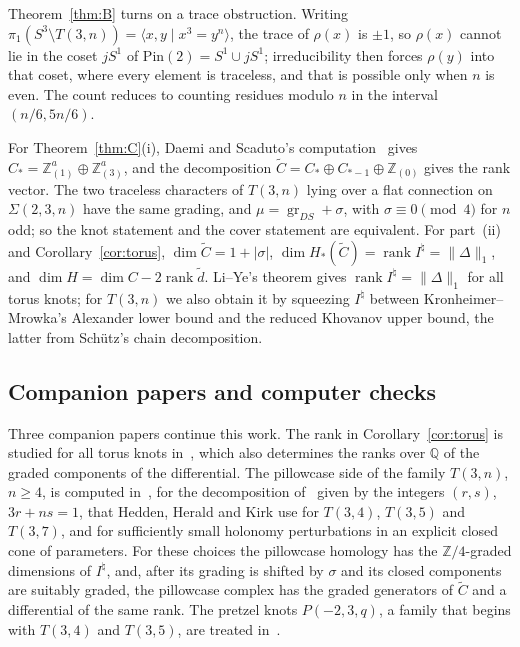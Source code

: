 \documentclass[11pt,reqno]{amsart}
\theoremstyle{plain}
\theoremstyle{definition}
\newcommand{\Z}{\mathbb{Z}}
\newcommand{\Pin}{\mathrm{Pin}(2)}
\newcommand{\Inat}{I^{\natural}}
\newcommand{\gr}{\operatorname{gr}}
\newcommand{\Sig}{\Sigma}
\newcommand{\td}{\widetilde d}
\begin{document}
Theorem~\ref{thm:B} turns on a trace obstruction. Writing $\pi_1(S^3\setminus T(3,n))=\langle x,y\mid
x^3=y^n\rangle$, the trace of $\rho(x)$ is $\pm1$, so $\rho(x)$ cannot lie in the coset $jS^1$ of
$\Pin=S^1\cup jS^1$; irreducibility then forces $\rho(y)$ into that coset, where every element is
traceless, and that is possible only when $n$ is even. The count reduces to counting residues modulo
$n$ in the interval $(n/6,5n/6)$.

For Theorem~\ref{thm:C}(i), Daemi and Scaduto's computation~\cite[Cor.~3]{DScaduto} gives $C_*=\Z^a_{(1)}\oplus\Z^a_{(3)}$, and
the decomposition $\widetilde C=C_*\oplus C_{*-1}\oplus\Z_{(0)}$ gives the rank vector. The two traceless
characters of $T(3,n)$ lying over a flat connection on $\Sig(2,3,n)$ have the same grading, and
$\mu=\gr_{DS}+\sigma$, with $\sigma\equiv0\pmod4$ for $n$ odd; so the knot statement and the cover statement
are equivalent. For part~(ii) and Corollary~\ref{cor:torus}, $\dim\widetilde C=1+|\sigma|$, $\dim
H_*(\widetilde C)=\operatorname{rank}\Inat=\|\Delta\|_1$, and $\dim H=\dim C-2\operatorname{rank}\td$. Li--Ye's
theorem gives $\operatorname{rank}\Inat=\|\Delta\|_1$ for all torus knots; for $T(3,n)$ we also obtain it by
squeezing $\Inat$ between Kronheimer--Mrowka's Alexander lower bound and the reduced Khovanov upper bound,
the latter from Sch\"utz's chain decomposition.

\subsection{Companion papers and computer checks}\label{sec:intro-companions}
Three companion papers continue this work. The rank in Corollary~\ref{cor:torus} is studied for all torus
knots in~\cite{WuebbenIV}, which also determines the ranks over $\mathbb Q$ of the graded components of the
differential. The pillowcase side of the family $T(3,n)$, $n\ge4$, is computed in~\cite{WuebbenV}, for the
decomposition of~\cite[\S10]{HHK2} given by the integers $(r,s)$, $3r+ns=1$, that Hedden, Herald and Kirk use
for $T(3,4)$, $T(3,5)$ and $T(3,7)$, and for sufficiently small holonomy perturbations in an explicit closed
cone of parameters. For these choices the pillowcase homology has the $\Z/4$-graded dimensions of $\Inat$,
and, after its grading is shifted by $\sigma$ and its closed components are suitably graded, the pillowcase
complex has the graded generators of $\widetilde C$ and a differential of the same rank. The pretzel knots
$P(-2,3,q)$, a family that begins with $T(3,4)$ and $T(3,5)$, are treated in~\cite{WuebbenII,WuebbenIIb}.
\end{document}

